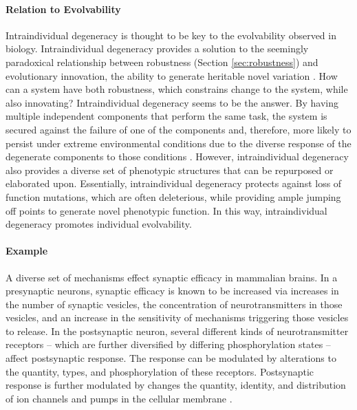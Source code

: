 \paragraph{Relation to Evolvability}
Intraindividual degeneracy is thought to be key to the evolvability observed in biology. Intraindividual degeneracy provides a solution to the seemingly paradoxical relationship between robustness (Section \ref{sec:robustness}) and evolutionary innovation, the ability to generate heritable novel variation \cite{Whitacre2010Degeneracy:Evolvability}.\mindmapmark{\individualevolvabilityrobustness}\mindmapmark{\individualevolvabilityrobustnessintraindividualdegeneracy} How can a system have both robustness, which constrains change to the system, while also innovating? Intraindividual degeneracy seems to be the answer. By having multiple independent components that perform the same task, the system is secured against the failure of one of the components and, therefore, more likely to persist under extreme environmental conditions due to the diverse response of the degenerate components to those conditions \cite{Whitacre2010Degeneracy:Evolvability}.\mindmapmark{\robustnessintraindividualdegeneracy} However, intraindividual degeneracy also provides a diverse set of phenotypic structures that can be repurposed or elaborated upon. Essentially, intraindividual degeneracy protects against loss of function mutations, which are often deleterious, while providing ample jumping off points to generate novel phenotypic function. In this way, intraindividual degeneracy promotes individual evolvability. \mindmapmark{\individualevolvabilityintraindividualdegeneracy}

\paragraph{Example}
A diverse set of mechanisms effect synaptic efficacy in mammalian brains. In a presynaptic neurons, synaptic efficacy is known to be increased via increases in the number of synaptic vesicles, the concentration of neurotransmitters in those vesicles, and an increase in the sensitivity of mechanisms triggering those vesicles to release. In the postsynaptic neuron, several different kinds of neurotransmitter receptors -- which are further diversified by differing phosphorylation states -- affect postsynaptic response. The response can be modulated by alterations to the quantity, types, and phosphorylation of these receptors. Postsynaptic response is further modulated by changes the quantity, identity, and distribution of ion channels and pumps in the cellular membrane \cite{Edelman2001DegeneracySystems}. 

